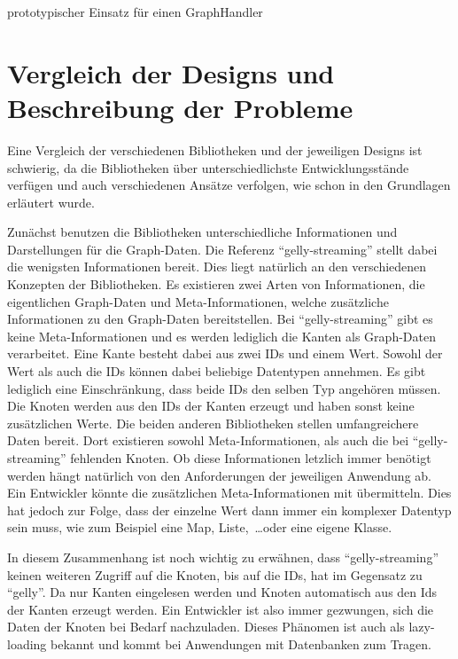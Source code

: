 \begin{listing}
    \inputminted[breaklines=true]{java}{../material/code/GephiGraphHandler.java}
    \caption{prototypischer Einsatz für einen GraphHandler}
    \label{code:GephiGraphHandler}
\end{listing}

\section{Vergleich der Designs und Beschreibung der Probleme}
Eine Vergleich der verschiedenen Bibliotheken und der jeweiligen Designs ist
schwierig, da die Bibliotheken über unterschiedlichste Entwicklungsstände
verfügen und auch verschiedenen Ansätze verfolgen, wie schon in den Grundlagen
erläutert wurde.

Zunächst benutzen die Bibliotheken unterschiedliche Informationen und Darstellungen
für die Graph-Daten. Die Referenz \enquote{gelly-streaming} stellt dabei die
wenigsten Informationen bereit. Dies liegt natürlich an den verschiedenen
Konzepten der Bibliotheken. Es existieren zwei Arten von Informationen, die
eigentlichen Graph-Daten und Meta-Informationen, welche zusätzliche Informationen
zu den Graph-Daten bereitstellen. Bei \enquote{gelly-streaming} gibt es keine
Meta-Informationen und es werden lediglich die Kanten als Graph-Daten verarbeitet.
Eine Kante besteht dabei aus zwei IDs und einem Wert. Sowohl der Wert als auch
die IDs können dabei beliebige Datentypen annehmen. Es gibt lediglich eine
Einschränkung, dass beide IDs den selben Typ angehören müssen. Die Knoten werden
aus den IDs der Kanten erzeugt und haben sonst keine zusätzlichen Werte. Die
beiden anderen Bibliotheken stellen umfangreichere Daten bereit. Dort existieren
sowohl Meta-Informationen, als auch die bei \enquote{gelly-streaming} fehlenden
Knoten. Ob diese Informationen letzlich immer benötigt werden hängt natürlich
von den Anforderungen der jeweiligen Anwendung ab. Ein Entwickler könnte die
zusätzlichen Meta-Informationen mit übermitteln. Dies hat jedoch zur Folge, dass
der einzelne Wert dann immer ein komplexer Datentyp sein muss, wie zum Beispiel
eine Map, Liste,~\dots oder eine eigene Klasse.

In diesem Zusammenhang ist noch wichtig zu erwähnen, dass \enquote{gelly-streaming}
keinen weiteren Zugriff auf die Knoten, bis auf die IDs, hat im Gegensatz zu \enquote{gelly}.
Da nur Kanten eingelesen werden und Knoten automatisch aus den Ids der Kanten
erzeugt werden. Ein Entwickler ist also immer gezwungen, sich die Daten der
Knoten bei Bedarf nachzuladen. Dieses Phänomen ist auch als lazy-loading bekannt
und kommt bei Anwendungen mit Datenbanken zum Tragen.

